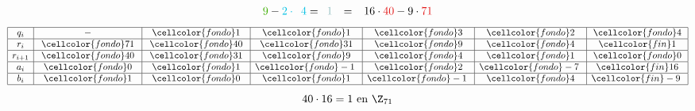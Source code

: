 \documentclass[10pt,t]{beamer}
\begin{document}
\begin{frame}
{\begin{plainexample}
\[\begin{array}{rl}
            \textcolor{miVerde}   {9} - \textcolor{miAzul}{2\cdot\phantom{3}4}  = \phantom{3}\textcolor{fin}   {1}
            &=     \phantom{-}16          \cdot\textcolor{miRojo}{40}           -9\cdot\textcolor{miRojo}{71} 
        \end{array}
        \]
        \[
            \begin{array}{|c|c|c|c|c|c|c|}
                \hline
                q_i  &  -                  &\cellcolor{fondo}1  &\cellcolor{fondo}1  &\cellcolor{fondo}3 &\cellcolor{fondo}2  & \cellcolor{fondo}4 \\
                \hline
                r_i  &\phantom{l}\cellcolor{fondo}71\phantom{l} &\phantom{l}\cellcolor{fondo}40\phantom{l} &\cellcolor{fondo}31 &\cellcolor{fondo}9 &\cellcolor{fondo}4  &\cellcolor{fin} 1 \\
                \hline
                r_{i+1} &\cellcolor{fondo}40 &\cellcolor{fondo}31 &\cellcolor{fondo}9  &\cellcolor{fondo}4 &\cellcolor{fondo} 1 & \cellcolor{fondo}0 \\
                \hline
                a_i     &\cellcolor{fondo}0  &\cellcolor{fondo}1  &\cellcolor{fondo}-1\phantom{l} &\cellcolor{fondo}2 &\cellcolor{fondo} -7\phantom{l}&\cellcolor{fin}16 \\
                \hline
                b_i &\cellcolor{fondo}   1   &\cellcolor{fondo}0  &\cellcolor{fondo}1  &\cellcolor{fondo}-1\phantom{l}&\cellcolor{fondo}4  &\cellcolor{fin}-9\phantom{l} \\
                \hline
            \end{array}
        \]
        \[40 \cdot 16 = 1 \text{ en } \Z_{71}\]
    \end{plainexample}
    }

\end{frame}
\end{document}
